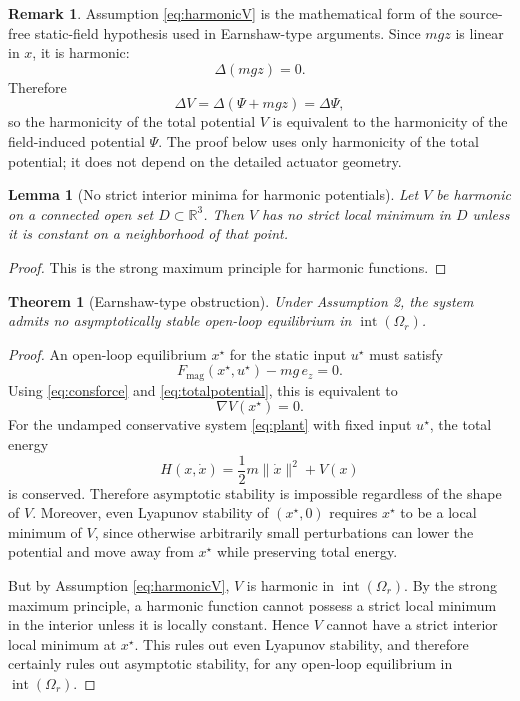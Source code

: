 \documentclass[11pt]{article}
\newtheorem{theorem}{Theorem}
\newtheorem{lemma}{Lemma}
\theoremstyle{definition}
\newtheorem{remark}{Remark}
\begin{document}
\begin{remark}
Assumption \eqref{eq:harmonicV} is the mathematical form of the source-free static-field hypothesis used in Earnshaw-type arguments. Since $mgz$ is linear in $x$, it is harmonic:
\[
\Delta(mgz)=0.
\]
Therefore
\[
\Delta V = \Delta(\Psi+mgz)=\Delta\Psi,
\]
so the harmonicity of the total potential $V$ is equivalent to the harmonicity of the field-induced potential $\Psi$. The proof below uses only harmonicity of the total potential; it does not depend on the detailed actuator geometry.
\end{remark}

\begin{lemma}[No strict interior minima for harmonic potentials]
Let $V$ be harmonic on a connected open set $D\subset\mathbb{R}^3$. Then $V$ has no strict local minimum in $D$ unless it is constant on a neighborhood of that point.
\end{lemma}

\begin{proof}
This is the strong maximum principle for harmonic functions.
\end{proof}

\begin{theorem}[Earnshaw-type obstruction]
Under Assumption 2, the system admits no asymptotically stable open-loop equilibrium in $\operatorname{int}(\Omega_r)$.
\end{theorem}

\begin{proof}
An open-loop equilibrium $x^\star$ for the static input $u^\star$ must satisfy
\[
F_{\mathrm{mag}}(x^\star,u^\star)-mg\,e_z=0.
\]
Using \eqref{eq:consforce} and \eqref{eq:totalpotential}, this is equivalent to
\[
\nabla V(x^\star)=0.
\]
For the undamped conservative system \eqref{eq:plant} with fixed input $u^\star$, the total energy
\[
H(x,\dot x)=\frac12 m\|\dot x\|^2 + V(x)
\]
is conserved. Therefore asymptotic stability is impossible regardless of the shape of $V$. Moreover, even Lyapunov stability of $(x^\star,0)$ requires $x^\star$ to be a local minimum of $V$, since otherwise arbitrarily small perturbations can lower the potential and move away from $x^\star$ while preserving total energy.

But by Assumption \eqref{eq:harmonicV}, $V$ is harmonic in $\operatorname{int}(\Omega_r)$. By the strong maximum principle, a harmonic function cannot possess a strict local minimum in the interior unless it is locally constant. Hence $V$ cannot have a strict interior local minimum at $x^\star$. This rules out even Lyapunov stability, and therefore certainly rules out asymptotic stability, for any open-loop equilibrium in $\operatorname{int}(\Omega_r)$.
\end{proof}
\end{document}

